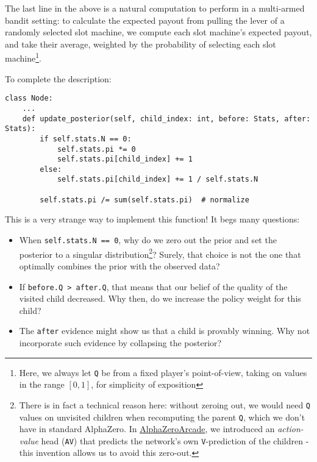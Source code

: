 \documentclass[tikz]{article}
\begin{document}
The last line in the above is a natural computation to perform in a multi-armed bandit setting: 
to calculate the expected payout from pulling the lever of a randomly selected slot machine, 
we compute each slot machine's expected payout, and take their average, weighted by the probability of
selecting each slot machine\footnote{Here, we always let \texttt{Q} be from a fixed player's point-of-view, taking on values in the range $[0, 1]$, for simplicity of exposition}. \newline

\newpage

To complete the description:

\begin{tcolorbox}
\begin{verbatim}
class Node:
    ...
    def update_posterior(self, child_index: int, before: Stats, after: Stats):
        if self.stats.N == 0:
            self.stats.pi *= 0
            self.stats.pi[child_index] += 1
        else:
            self.stats.pi[child_index] += 1 / self.stats.N

        self.stats.pi /= sum(self.stats.pi)  # normalize
\end{verbatim}
\end{tcolorbox}

This is a very strange way to implement this function! It begs many questions:

\begin{itemize}
    \item When \texttt{self.stats.N == 0}, why do we zero out the prior and set the posterior to a singular distribution\footnote{
    There is in fact a technical reason here: without zeroing out, we would need \texttt{Q} values on unvisited children when recomputing
    the parent \texttt{Q}, which we don't have in standard AlphaZero. In \href{https://github.com/shindavid/AlphaZeroArcade}{AlphaZeroArcade},
    we introduced an \emph{action-value} head (\texttt{AV}) that predicts the network's own \texttt{V}-prediction of the children - this invention
    allows us to avoid this zero-out.}?
    Surely, that choice is not the one that optimally combines the prior with the observed data?
    \item If \texttt{before.Q > after.Q}, that means that our belief of the quality of the visited child decreased. Why then, do we increase the policy weight for this child?
    \item The \texttt{after} evidence might show us that a child is provably winning. Why not incorporate such evidence by collapsing the posterior?
\end{itemize}
\end{document}
